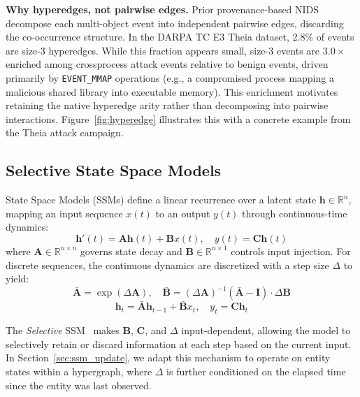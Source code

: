 \documentclass[letterpaper,twocolumn,10pt]{article}
\begin{document}
\textbf{Why hyperedges, not pairwise edges.} Prior provenance-based NIDS~\cite{cheng2024kairos,jia2024magic,rehman2024flash,Wang2021THREATRACEDA} decompose each multi-object event into independent pairwise edges, discarding the co-occurrence structure. In the DARPA TC E3 Theia dataset, 2.8\% of events are size-3 hyperedges. While this fraction appears small, size-3 events are $3.0\times$ enriched among crossprocess attack events relative to benign events, driven primarily by \texttt{EVENT\_MMAP} operations (e.g., a compromised process mapping a malicious shared library into executable memory). This enrichment motivates retaining the native hyperedge arity rather than decomposing into pairwise interactions. Figure~\ref{fig:hyperedge} illustrates this with a concrete example from the Theia attack campaign.



\subsection{Selective State Space Models}
\label{sec:ssm_background}

State Space Models (SSMs) define a linear recurrence over a latent state $\mathbf{h} \in \mathbb{R}^n$, mapping an input sequence $x(t)$ to an output $y(t)$ through continuous-time dynamics:
\begin{equation}
    \mathbf{h}'(t) = \mathbf{A}\mathbf{h}(t) + \mathbf{B}x(t), \quad y(t) = \mathbf{C}\mathbf{h}(t)
\end{equation}
where $\mathbf{A} \in \mathbb{R}^{n \times n}$ governs state decay and $\mathbf{B} \in \mathbb{R}^{n \times 1}$ controls input injection. For discrete sequences, the continuous dynamics are discretized with a step size $\Delta$ to yield:
\begin{equation}
    \bar{\mathbf{A}} = \exp(\Delta \mathbf{A}), \quad \bar{\mathbf{B}} = (\Delta \mathbf{A})^{-1}(\bar{\mathbf{A}} - \mathbf{I}) \cdot \Delta \mathbf{B}
\end{equation}
\begin{equation}
    \mathbf{h}_t = \bar{\mathbf{A}} \mathbf{h}_{t-1} + \bar{\mathbf{B}} x_t, \quad y_t = \mathbf{C} \mathbf{h}_t
\end{equation}

The \emph{Selective} SSM~\cite{gu2024mamba} makes $\mathbf{B}$, $\mathbf{C}$, and $\Delta$ input-dependent, allowing the model to selectively retain or discard information at each step based on the current input. In Section~\ref{sec:ssm_update}, we adapt this mechanism to operate on entity states within a hypergraph, where $\Delta$ is further conditioned on the elapsed time since the entity was last observed.
\end{document}
